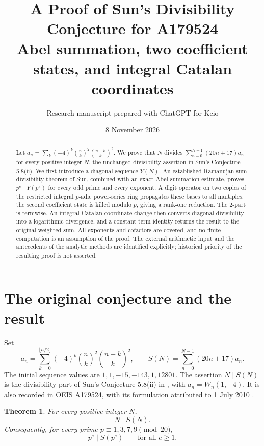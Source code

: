 \documentclass[11pt,a4paper]{article}
\title{\textbf{A Proof of Sun's Divisibility\\Conjecture for A179524}\\[5pt]
\large Abel summation, two coefficient states, and integral Catalan coordinates}
\author{Research manuscript prepared with ChatGPT for Keio}
\date{8 November 2026}
\newtheorem{theorem}{Theorem}[section]
\theoremstyle{remark}\newtheorem{remark}[theorem]{Remark}
\begin{document}
\maketitle
\begin{abstract}
Let \(a_n=\sum_k(-4)^k\binom nk^2\binom{n-k}k^2\).
We prove that \(N\) divides \(\sum_{n=0}^{N-1}(20n+17)a_n\) for every
positive integer \(N\), the unchanged divisibility assertion in Sun's
Conjecture 5.8(ii).
We first introduce a diagonal sequence \(Y(N)\). An established
Ramanujan-sum divisibility theorem of Sun, combined with an exact
Abel-summation estimate, proves \(p^e\mid Y(p^e)\) for every odd prime
and every exponent. A digit operator on two copies of the restricted
integral \(p\)-adic power-series ring propagates these bases to all
multiples: the second coefficient state is killed modulo \(p\), giving
a rank-one reduction. The 2-part is termwise. An integral Catalan
coordinate change then converts diagonal divisibility into a
logarithmic divergence, and a constant-term identity returns the result
to the original weighted sum.
All exponents and cofactors are covered, and no finite computation is
an assumption of the proof. The external arithmetic input and the
antecedents of the analytic methods are identified explicitly;
historical priority of the resulting proof is not asserted.
\end{abstract}

\section{The original conjecture and the result}\label{sec:intro}

Set
\begin{equation}\label{eq:original}
 a_n=\sum_{k=0}^{\lfloor n/2\rfloor}
       (-4)^k\binom nk^2\binom{n-k}k^2,
 \qquad S(N)=\sum_{n=0}^{N-1}(20n+17)a_n.
\end{equation}
The initial sequence values are \(1,1,-15,-143,1,12801\).
The assertion \(N\mid S(N)\) is the divisibility part of Sun's
Conjecture 5.8(ii) in \cite[printed p.~33]{Sun2010}, with
\(a_n=W_n(1,-4)\). It is also recorded in OEIS A179524, with its
formulation attributed to 1 July 2010 \cite{OEIS}.

\begin{theorem}\label{thm:main}
For every positive integer \(N\),
\[
                     \boxed{\quad N\mid S(N).\quad}
\]
Consequently, for every prime \(p\equiv1,3,7,9\pmod{20}\),
\[
                   p^e\mid S(p^e)\qquad\text{for all }e\ge1.
\]
\end{theorem}
\end{document}

